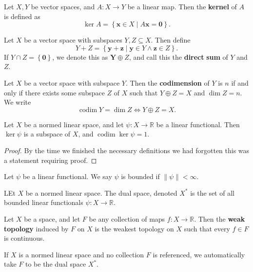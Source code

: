 \documentclass[11pt, letterpaper]{report}
\begin{document}
\begin{definition}[Kernel]\label{dfn:2.21}
	Let $X,Y$ be vector spaces, and $A : X \to Y$ be a linear map. Then the \textbf{kernel} of $A$ is defined as
	\[
		\ker A=\left\{ \mathbf{x}\in X \mid A \mathbf{x}=\mathbf{0} \right\} 
	.\]
\end{definition}
\begin{definition}\label{dfn:2.22}
	Let $X$ be a vector space with subspaces $Y,Z\subseteq  X$. Then define
	\[
		Y+Z=\left\{ \mathbf{y}+\mathbf{z} \mid \mathbf{y}\in Y\land \mathbf{z}\in Z \right\} 
	.\]
	If $Y\cap Z=\left\{ \mathbf{0} \right\} $, we denote this as $\mathbf{Y}\oplus Z$, and call this the \textbf{direct} \textbf{sum} of $Y$ and $Z$.
\end{definition}
\begin{definition}[Codimension]\label{dfn:2.23}
	Let $X$ be a vector space with subspace $Y$. Then the \textbf{codimension} of $Y$ is $n$ if and only if there exists some subspace $Z$ of $X$ such that $Y\oplus Z=X$ and $\dim Z=n$. We write
	\[
		\operatorname{codim}Y=\dim Z \iff Y\oplus Z=X 
	.\]
\end{definition}
\begin{proposition}
	Let $X$ be a normed linear space, and let $\psi : X \to \mathbb{R}$ be a linear functional. Then $\ker \psi $ is a subspace of $X$, and $\operatorname{codim} \ker \psi =1$.
\end{proposition}
\begin{proof}
	By the time we finished the necessary definitions we had forgotten this was a statement requiring proof.
\end{proof}
\begin{definition}\label{dfn:2.24}
	Let $\psi $ be a linear functional. We say $\psi $ is bounded if $\left\lVert \psi  \right\rVert <\infty$.
\end{definition}
\begin{definition}\label{dfn:2.25}
	LEt $X$ be a normed linear space. The dual space, denoted $X^*$ is the set of all bounded linear functionals $\psi : X \to \mathbb{R}$.
\end{definition}
\begin{definition}\label{dfn:2.26}
	Let $X$ be a space, and let $F$ be any collection of maps $f : X \to \mathbb{R}$. Then the \textbf{weak} \textbf{topology} induced by $F$ on $X$ is the weakest topology on $X$ such that every $f\in F$ is continuous.

	If $X$ is a normed linear space and no collection $F$ is referenced, we automatically take $F$ to be the dual space $X^*$.
\end{definition}
\end{document}
